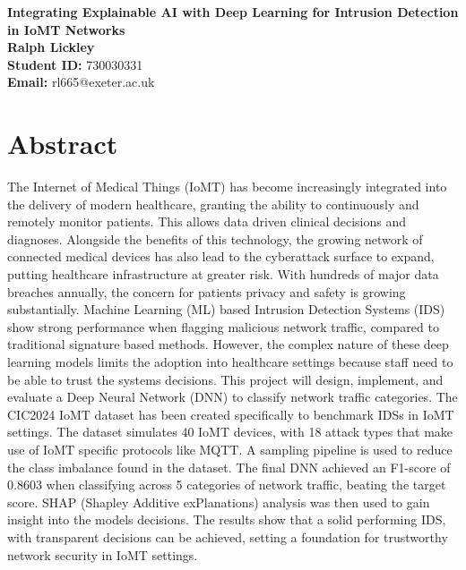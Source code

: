 \documentclass[11pt,a4paper]{article}
\begin{document}
\singlespacing  %
\thispagestyle{empty} %

\begin{center}
    {\bf \LARGE Integrating Explainable AI with Deep Learning for Intrusion Detection in IoMT Networks}\\[0.5cm]
    \textbf{Ralph Lickley} \\[0.2cm]
    \textbf{Student ID:} 730030331 \\[1cm]
    \textbf{Email:} rl665@exeter.ac.uk \\[1cm]
\end{center}

\section*{Abstract}

\noindent
The Internet of Medical Things (IoMT) has become increasingly integrated into the delivery of modern healthcare, granting the ability to continuously and remotely monitor patients. This allows data driven clinical decisions and diagnoses. Alongside the benefits of this technology, the growing network of connected medical devices has also lead to the cyberattack surface to expand, putting healthcare infrastructure at greater risk. With hundreds of major data breaches annually, the concern for patients privacy and safety is growing substantially. Machine Learning (ML) based Intrusion Detection Systems (IDS) show strong performance when flagging malicious network traffic, compared to traditional signature based methods. However, the complex nature of these deep learning models limits the adoption into healthcare settings because staff need to be able to trust the systems decisions.
This project will design, implement, and evaluate a Deep Neural Network (DNN) to classify network traffic categories. The CIC2024 IoMT dataset has been created specifically to benchmark IDSs in IoMT settings. The dataset simulates 40 IoMT devices, with 18 attack types that make use of IoMT specific protocols like MQTT. A sampling pipeline is used to reduce the class imbalance found in the dataset. The final DNN achieved an F1-score of $0.8603$ when classifying across 5 categories of network traffic, beating the target score. SHAP (Shapley Additive exPlanations) analysis was then used to gain insight into the models decisions.
The results show that a solid performing IDS, with transparent decisions can be achieved, setting a foundation for trustworthy network security in IoMT settings.
\vspace*{\fill}
\end{document}
